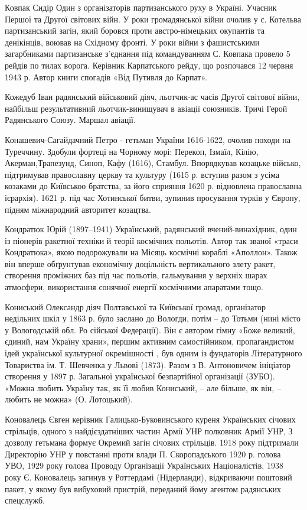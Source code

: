 Ковпак Сидір Один з організаторів партизанського руху в Україні. Учасник Першої та Другої світових війн. У роки громадянської війни очолив у с. Котельва партизанський загін, який боровся проти австро-німецьких окупантів та денікінців, воював на Східному фронті. У роки війни з фашистськими загарбниками партизанське з'єднання під командуванням С. Ковпака провело 5 рейдів по тилах ворога. Керівник Карпатського рейду, що розпочався 12 червня 1943 р. Автор книги спогадів «Від Путивля до Карпат». 

Кожедуб Іван радянський військовий діяч, льотчик-ас часів Другої світової війни, найбільш результативний льотчик-винищувач в авіації союзників. Тричі Герой Радянського Союзу. Маршал авіації.

Конашевич-Сагайдачний Петро  - гетьман України 1616-1622, очолив походи на Туреччину. Здобули фортеці на Чорному морі: Перекоп, Ізмаїл, Кілію, Акерман,Трапезунд, Синоп, Кафу (1616), Стамбул. Впорядкував козацьке військо, підтримував православну церкву та культуру (1615 р. вступив разом з усіма козаками до Київськоо братства, за його сприяння 1620 р. відновлена православна ієрархія). 1621 р. під час Хотинської битви, зупинив просування турків у Європу, підням міжнародний авторитет козацтва.

Кондратюк Юрій (1897–1941) Український, радянський вчений-винахідник, один із піонерів ракетної техніки й теорії космічних польотів. Автор так званої «траси Кондратюка», якою подорожували на Місяць космічні кораблі «Аполлон». Також він вперше обґрунтував економічну доцільність вертикального злету ракет, створення проміжних баз під час польотів, гальмування у верхніх шарах атмосфери, використання сонячної енергії космічними апаратами тощо.

Кониський Олександр  діяч Полтавської та Київської громад, організатор недільних шкіл у 1863 р. було заслано до Вологди, потім – до Тотьми (нині місто у Вологодській обл. Ро сійської Федерації). Він є автором гімну «Боже великий, єдиний, нам Україну храни», першим активним самостійником, пропагандистом ідей української культурної окремішності , був одним із фундаторів Літературного Товариства ім. Т. Шевченка у Львові (1873). Разом з  В. Антоновичем ініціатор створення у 1897 р.  Загальної української безпартійної організації (ЗУБО). «Можна любить Україну так, як її любив Кониський, – але більше, як він, – любить не можна» (О. Лотоцький).

Коновалець Євген керівник Галицько-Буковинського куреня Українських січових стрільців, одного з найдієздатніших частин Армії УНР полковник Армії УНР, З дозволу гетьмана формує Окремий загін січових стрільців. 1918 року підтримали Директорію УНР у повстанні проти влади П. Скоропадського 1920 р. голова УВО, 1929 року голова Проводу Організації Українських Націоналістів. 1938 року Є. Коновалець загинув у Роттердамі (Нідерланди), відкриваючи поштовий пакет, у якому був вибуховий пристрій, переданий йому агентом радянських спецслужб. 

